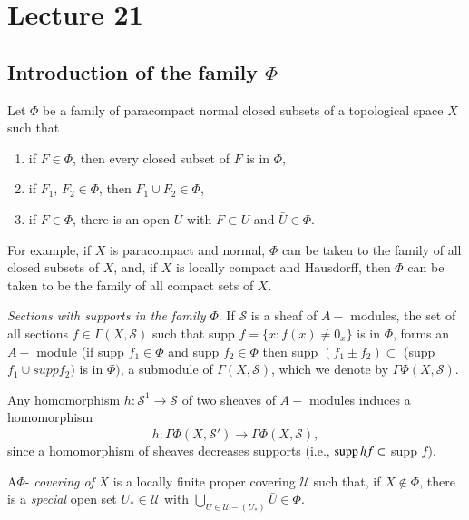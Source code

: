  \chapter{Lecture 21}\label{chap21:lec21}%
 
 \section*{Introduction of the family $\Phi$}\pageoriginale  
 
 Let $\Phi$ be a family of paracompact normal closed subsets of a 
 topological space $X$ such that  
 \begin{enumerate}[(1)]
\item if $F \in \Phi$, then every closed subset of $F$ is in $\Phi$, 

\item if $F_1$, $F_2 \in \Phi$, then $F_1 \cup F_2 \in \Phi$,

\item if $F \in \Phi$, there is an open $U$ with $F \subset U$ and
  $\bar{U} \in \Phi$. 
 \end{enumerate} 
 
 For example, if $X$ is paracompact and normal, $\Phi$ can be taken to
 the family of all closed subsets of $X$, and, if $X$ is locally
 compact and Hausdorff, then $\Phi$ can be taken to be the family of
 all compact sets of $X$. 

\medskip
\textit{Sections with supports in the family $\Phi$}. If $\mathscr{S}$
is a sheaf of $A-$ modules, the set of all sections $f \in \Gamma (X ,
\mathscr{S})$ such that supp $f = \bigg\{ x : f(x) \neq 0_x \bigg\}$
is in $\Phi$, forms an $A-$ module (if supp $f_1 \in \Phi$ and supp $f_2
\in \Phi$ then supp $(f_1 \pm f_2) \subset$ (supp $f_1 \cup supp f_2)$
is in $\Phi)$, a submodule of $\Gamma (X, \mathscr{S})$, which we
denote by $\Gamma \Phi (X , \mathscr{S})$. 

Any homomorphism $h : \mathscr{S}^1 \rightarrow \mathscr{S}$ of two
sheaves of $A-$ modules induces a homomorphism  
$$
h : \Gamma \bar{{\Phi}}(X, \mathscr{S}') \rightarrow \Gamma \bar{\Phi}
(X, \mathscr{S}), 
$$
since a homomorphism of sheaves decreases supports (i.e., $\operatorname{supp} hf
\subset$ supp $f$). 

\begin{defi*}%
 A\pageoriginale $\Phi$- {\em covering of} $X$ is a locally finite
 proper covering $\mathscr{U}$ such that, if $X \notin \Phi$, there is
 a {\em special} open set $U_* \in \mathscr{U} $ with $\bigcup
 \limits_{U \in \mathscr{U}- (U_*)} \bar{U} \in \Phi$.  
\end{defi*}

